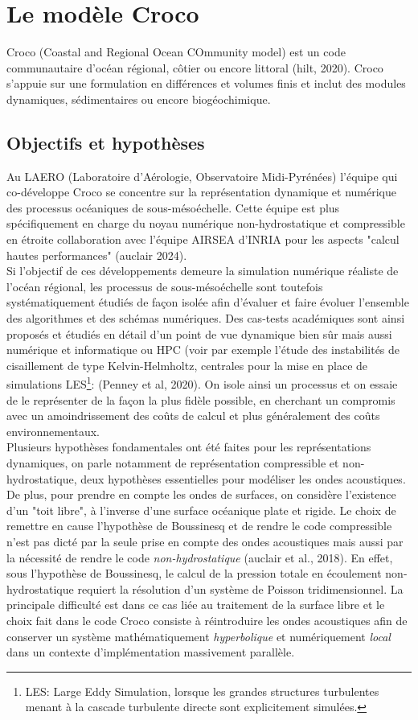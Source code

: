 \documentclass{rapportECC}
\begin{document}
\section{Le modèle Croco}
Croco (Coastal and Regional Ocean COmmunity model) est un code communautaire d'océan régional, côtier ou encore littoral (hilt, 2020). Croco s'appuie sur une formulation en différences et volumes finis et inclut des modules dynamiques, sédimentaires ou encore biogéochimique. \\


\subsection{Objectifs et hypothèses}
Au LAERO (Laboratoire d'Aérologie, Observatoire Midi-Pyrénées) l'équipe qui co-développe Croco se concentre sur la représentation dynamique et numérique des processus océaniques de sous-mésoéchelle. Cette équipe est plus spécifiquement en charge du noyau numérique non-hydrostatique et compressible en étroite collaboration avec l'équipe AIRSEA d'INRIA pour les aspects "calcul hautes performances" (auclair 2024).\\
Si l'objectif de ces développements demeure la simulation numérique réaliste de l'océan régional, les processus de sous-mésoéchelle sont toutefois systématiquement étudiés de façon isolée afin d'évaluer et faire évoluer l'ensemble des algorithmes et des schémas numériques. Des cas-tests académiques sont ainsi proposés et étudiés en détail d'un point de vue dynamique bien sûr mais aussi numérique et informatique ou HPC (voir par exemple l'étude des instabilités de cisaillement de type Kelvin-Helmholtz, centrales pour la mise en place de simulations LES\footnote{LES: Large Eddy Simulation, lorsque les grandes structures turbulentes menant à la cascade turbulente directe sont explicitement simulées.}: (Penney et al, 2020).
 On isole ainsi un processus et on essaie de le représenter de la façon la plus fidèle possible, en cherchant un compromis avec un amoindrissement des coûts de calcul et plus généralement des coûts environnementaux.
\\
Plusieurs hypothèses fondamentales ont été faites pour les représentations dynamiques, on parle notamment de représentation compressible et non-hydrostatique, deux hypothèses essentielles pour modéliser les ondes acoustiques. De plus, pour prendre en compte les ondes de surfaces, on considère l'existence d'un "toit libre", à l'inverse d'une surface océanique plate et rigide. Le choix de remettre en cause l'hypothèse de Boussinesq et de rendre le code compressible n'est pas dicté par la seule prise en compte des ondes acoustiques mais aussi par la nécessité de rendre le code \textit{non-hydrostatique} (auclair et al., 2018). En effet, sous l'hypothèse de Boussinesq, le calcul de la pression totale en écoulement non-hydrostatique requiert la résolution d'un système de Poisson tridimensionnel. La principale difficulté est dans ce cas liée au traitement de la surface libre et le choix fait dans le code Croco consiste à réintroduire les ondes acoustiques afin de conserver un système mathématiquement \textit{hyperbolique} et numériquement \textit{local} dans un contexte d'implémentation massivement parallèle.
\end{document}
